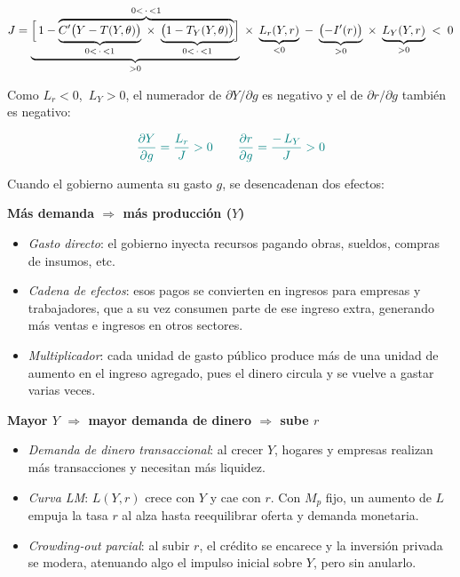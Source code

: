 \documentclass{article}
\begin{document}
\[
J
= 
\underbrace{\Bigl[\,1 
  - 
  \overbrace{%
    \underbrace{C'\bigl(Y - T(Y,\theta)\bigr)}_{0< \,\cdot\, <1}
    \;\times\;
    \underbrace{\bigl(1 - T_Y(Y,\theta)\bigr)}_{0< \,\cdot\, <1}
  }^{0 < \,\cdot\, < 1}
\Bigr]}_{>0}
\;\times\;
\underbrace{L_r(Y,r)}_{<0}
\;-\;
\underbrace{\bigl(-I'(r)\bigr)}_{>0}
\;\times\;
\underbrace{L_Y(Y,r)}_{>0}
\;<\;0
\]




Como \(L_r<0\), \(\,L_Y>0\), el numerador de \(\partial Y/\partial g\) es negativo y el de \(\partial r/\partial g\) también es negativo:

\[\color{teal}
\frac{\partial Y}{\partial g}
= \frac{L_r}{J}
>0
\qquad
\frac{\partial r}{\partial g}
= \frac{-\,L_Y}{J}
>0
\]


\begin{flushleft}
Cuando el gobierno aumenta su gasto \(g\), se desencadenan dos efectos:
\end{flushleft}
\noindent
\textbf{\color{teal}Más demanda \(\Rightarrow\) más producción (\(Y\))}
\begin{itemize}
  \item \emph{\color{teal}Gasto directo}: el gobierno inyecta recursos pagando obras, sueldos, compras de insumos, etc.
  \item \emph{\color{teal}Cadena de efectos}: esos pagos se convierten en ingresos para empresas y trabajadores, que a su vez consumen parte de ese ingreso extra, generando más ventas e ingresos en otros sectores.
  \item \emph{\color{teal}Multiplicador}: cada unidad de gasto público produce más de una unidad de aumento en el ingreso agregado, pues el dinero circula y se vuelve a gastar varias veces.
\end{itemize}

\noindent
\textbf{\color{teal}Mayor \(Y\) \(\Rightarrow\) mayor demanda de dinero \(\Rightarrow\) sube \(r\)}
\begin{itemize}
  \item \emph{\color{teal}Demanda de dinero transaccional}: al crecer \(Y\), hogares y empresas realizan más transacciones y necesitan más liquidez.
  \item \emph{\color{teal}Curva LM}: \(L(Y,r)\) crece con \(Y\) y cae con \(r\). Con \(M_p\) fijo, un aumento de \(L\) empuja la tasa \(r\) al alza hasta reequilibrar oferta y demanda monetaria.
  \item \emph{\color{teal}Crowding‑out parcial}: al subir \(r\), el crédito se encarece y la inversión privada se modera, atenuando algo el impulso inicial sobre \(Y\), pero sin anularlo.
\end{itemize}
\end{document}
